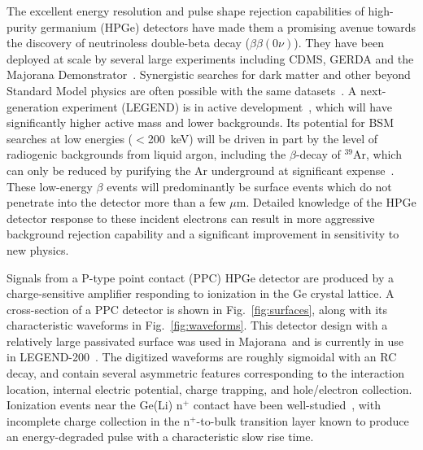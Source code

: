 \documentclass[nofootinbib,superscriptaddress, aps, prc, 
10pt, amsmath, amssymb, bibnotes,
altaffilletter, twocolumn, floatfix]{revtex4-2}
\def\MJ{{\sc Majorana}}
\def\MJD{{\sc Majorana Demonstrator}}
\def\nonubb{$\beta\beta(0\nu)$}
\begin{document}
    The excellent energy resolution and pulse shape rejection capabilities of high-purity germanium (HPGe) detectors have made them a promising avenue towards the discovery of neutrinoless double-beta decay (\nonubb). 
    They have been deployed at scale by several large experiments including CDMS, GERDA and the \MJD~\cite{cdms2000exclusion, majorana2023final, gerda2020final}.
    Synergistic searches for dark matter and other beyond Standard Model physics are often possible with the same datasets~\cite{wiseman2022exotic, gerda2020bosonic, cdms2019search}.
    A next-generation experiment (LEGEND) is in active development~\cite{legendSnowmass2021}, which will have significantly higher active mass and lower backgrounds.
    Its potential for BSM searches at low energies ($<$200~keV) will be driven in part by the level of radiogenic backgrounds from liquid argon, including the $\beta$-decay of $^{39}$Ar, which can only be reduced by purifying the Ar underground at significant expense~\cite{darkside2016}.
    These low-energy $\beta$ events will predominantly be surface events which do not penetrate into the detector more than a few $\mu$m.  
    Detailed knowledge of the HPGe detector response to these incident electrons can result in more aggressive background rejection capability and a significant improvement in sensitivity to new physics.
    
    Signals from a P-type point contact (PPC) HPGe detector are produced by a charge-sensitive amplifier responding to ionization in the Ge crystal lattice.
    A cross-section of a PPC detector is shown in Fig.~\ref{fig:surfaces}, along with its characteristic waveforms in Fig.~\ref{fig:waveforms}.
    This detector design with a relatively large passivated surface was used in \MJ\ and is currently in use in LEGEND-200~\cite{zsigmond2020legend}.
    The digitized waveforms are roughly sigmoidal with an RC decay, and contain several asymmetric features corresponding to the interaction location, internal electric potential, charge trapping, and hole/electron collection.
    Ionization events near the Ge(Li) n$^+$ contact have been well-studied~\cite{mandic2004cdms, aalseth2013cogent, vorren2017}, with incomplete charge collection in the n$^+$-to-bulk transition layer known to produce an energy-degraded pulse with a characteristic slow rise time.
\end{document}
